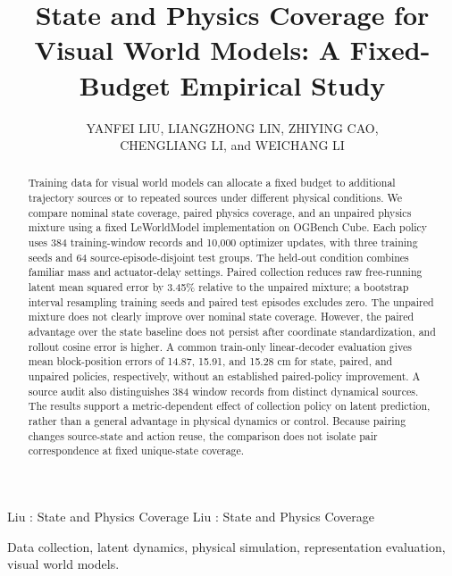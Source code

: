 \documentclass[nolineno]{ieeeaccess}
\begin{document}
\history{}
\doi{}

\title{State and Physics Coverage for Visual World Models: A Fixed-Budget Empirical Study}
\author{\uppercase{Yanfei Liu},
\uppercase{Liangzhong Lin},
\uppercase{Zhiying Cao},\\
\uppercase{Chengliang Li}, and
\uppercase{Weichang Li}}
\address[1]{Zhongshan Polytechnic, Zhongshan, Guangdong, China}
\address[2]{South China University of Technology, Guangzhou, Guangdong, China}
\address[3]{Beijing Normal-Hong Kong Baptist University, Zhuhai, China}
\markboth
{Liu \headeretal: State and Physics Coverage}
{Liu \headeretal: State and Physics Coverage}

\begin{abstract}
Training data for visual world models can allocate a fixed budget to additional trajectory sources or to repeated sources under different physical conditions. We compare nominal state coverage, paired physics coverage, and an unpaired physics mixture using a fixed LeWorldModel implementation on OGBench Cube. Each policy uses 384 training-window records and 10,000 optimizer updates, with three training seeds and 64 source-episode-disjoint test groups. The held-out condition combines familiar mass and actuator-delay settings. Paired collection reduces raw free-running latent mean squared error by 3.45\% relative to the unpaired mixture; a bootstrap interval resampling training seeds and paired test episodes excludes zero. The unpaired mixture does not clearly improve over nominal state coverage. However, the paired advantage over the state baseline does not persist after coordinate standardization, and rollout cosine error is higher. A common train-only linear-decoder evaluation gives mean block-position errors of 14.87, 15.91, and 15.28 cm for state, paired, and unpaired policies, respectively, without an established paired-policy improvement. A source audit also distinguishes 384 window records from distinct dynamical sources. The results support a metric-dependent effect of collection policy on latent prediction, rather than a general advantage in physical dynamics or control. Because pairing changes source-state and action reuse, the comparison does not isolate pair correspondence at fixed unique-state coverage.
\end{abstract}
\begin{keywords}
Data collection, latent dynamics, physical simulation, representation evaluation, visual world models.
\end{keywords}
\titlepgskip=-21pt
\maketitle

\end{document}
